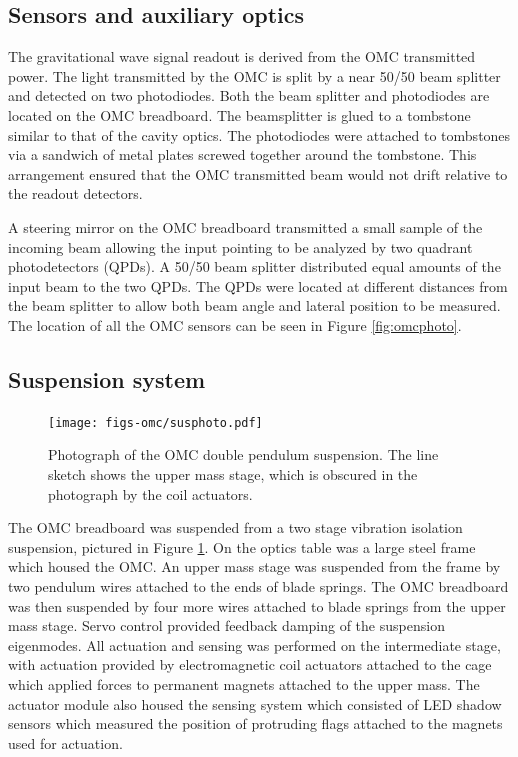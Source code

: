 \subsection{Sensors and auxiliary optics}

The gravitational wave signal readout is derived from the OMC transmitted power. %
The light transmitted by the OMC is split by a near 50/50 beam splitter and detected on two photodiodes. %
Both the beam splitter and photodiodes are located on the OMC breadboard. %
The beamsplitter is glued to a tombstone similar to that of the cavity optics. %
The photodiodes were attached to tombstones via a sandwich of metal plates screwed together around the tombstone. %
This arrangement ensured that the OMC transmitted beam would not drift relative to the readout detectors.

A steering mirror on the OMC breadboard transmitted a small sample of the incoming beam allowing the input pointing to be analyzed by two quadrant photodetectors (QPDs). %
A 50/50 beam splitter distributed equal amounts of the input beam to the two QPDs. %
The QPDs were located at different distances from the beam splitter to allow both beam angle and lateral position to be measured. %
The location of all the OMC sensors can be seen in Figure \ref{fig:omcphoto}.

\subsection{Suspension system}
\begin{figure}
  \begin{center}
  \leavevmode
  \texttt{[image: figs-omc/susphoto.pdf]}
  \end{center}
  \caption[Photograph of the OMC double pendulum suspension.]{Photograph of the OMC double pendulum suspension. The line sketch shows the upper mass stage, which is obscured in the photograph by the coil actuators.}
  \label{fig:susphoto}
\end{figure}

The OMC breadboard was suspended from a two stage vibration isolation suspension, pictured in Figure \ref{fig:susphoto}. %
On the optics table was a large steel frame which housed the OMC. %
An upper mass stage was suspended from the frame by two pendulum wires attached to the ends of blade springs. %
The OMC breadboard was then suspended by four more wires attached to blade springs from the upper mass stage. %
Servo control provided feedback damping of the suspension eigenmodes. %
All actuation and sensing was performed on the intermediate stage, with actuation provided by electromagnetic coil actuators attached to the cage which applied forces to permanent magnets attached to the upper mass. %
The actuator module also housed the sensing system which consisted of LED shadow sensors which measured the position of protruding flags attached to the magnets used for actuation.

